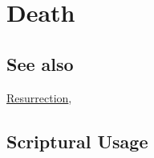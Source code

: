 \section{Death}
	\label{DEATH}
	
\subsection{See also}

	\hyperref[RESURRECTION]{Resurrection},




	


\subsection{Scriptural Usage} %
	\label{DEATH-SCRIPTURES}

